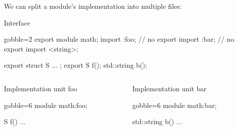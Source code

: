 \begin{frame}[fragile,shrink=5]
  \begin{block}{}
    We can split a module's implementation into multiple files:
  \end{block}
  \begin{exampleblock}{Interface}
    \begin{cppcode*}{gobble=2}
      export module math;
      import :foo; // no export
      import :bar; // no export
      import <string>;

      export struct S { ... };
      export S f();
      std::string b();
    \end{cppcode*}
  \end{exampleblock}
  \vspace{-5mm}
  \begin{columns}[t]
    \begin{column}{.45\textwidth}
      \begin{exampleblock}{Implementation unit foo}
        \begin{cppcode*}{gobble=6}
          module math:foo;

          S f() { ... }
        \end{cppcode*}
      \end{exampleblock}
    \end{column}
    \begin{column}{.45\textwidth}
      \begin{exampleblock}{Implementation unit bar}
        \begin{cppcode*}{gobble=6}
          module math:bar;

          std::string b() { ... }
        \end{cppcode*}
      \end{exampleblock}
    \end{column}
  \end{columns}
\end{frame}

